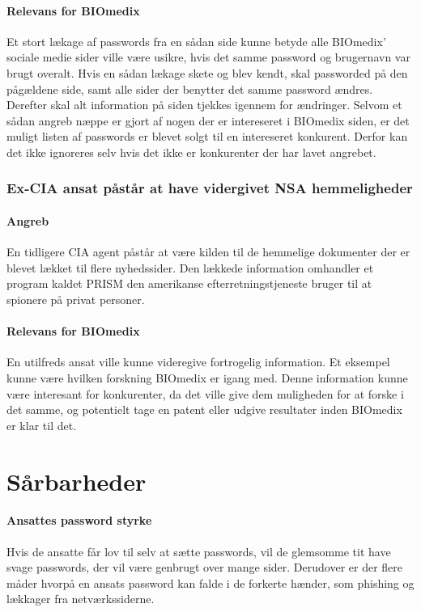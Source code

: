 \documentclass{article}
\begin{document}
\paragraph{Relevans for BIOmedix}

Et stort lækage af passwords fra en sådan side kunne betyde alle BIOmedix'
sociale medie sider ville være usikre, hvis det samme password og brugernavn var 
brugt overalt.
Hvis en sådan lækage skete og blev kendt, skal passworded på den pågældene side, samt
alle sider der benytter det samme password ændres. Derefter skal alt information på
siden tjekkes igennem for ændringer.
Selvom et sådan angreb næppe er gjort af nogen der er intereseret i BIOmedix siden, er
det muligt listen af passwords er blevet solgt til en intereseret konkurent. Derfor kan
det ikke ignoreres selv hvis det ikke er konkurenter der har lavet angrebet.

\subsubsection{Ex-CIA ansat påstår at have vidergivet NSA hemmeligheder} 

\paragraph{Angreb}
En tidligere CIA agent påstår at være kilden til de hemmelige dokumenter der er blevet
lækket til flere nyhedssider. Den lækkede information omhandler et program kaldet PRISM 
den amerikanse efterretningstjeneste bruger til at spionere på privat personer\cite{CIAStory}.

\paragraph{Relevans for BIOmedix}
En utilfreds ansat ville kunne videregive fortrogelig information. Et eksempel kunne være hvilken
forskning BIOmedix er igang med. Denne information kunne være interesant for konkurenter, da det ville
give dem muligheden for at forske i det samme, og potentielt tage en patent eller udgive resultater
inden BIOmedix er klar til det.


\section{Sårbarheder}

\paragraph{Ansattes password styrke}
Hvis de ansatte får lov til selv at sætte passwords, vil de glemsomme 
tit have svage passwords, der vil være genbrugt over mange sider.
Derudover er der flere måder hvorpå en ansats password kan falde i de
forkerte hænder, som phishing og lækkager fra netværkssiderne.
\end{document}
